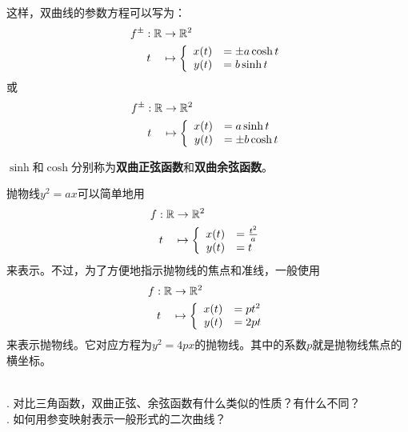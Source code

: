 \documentclass[12pt,UTF8,fontset=none]{ctexbook}
\begin{document}
这样，双曲线的参数方程可以写为：
\begin{align*}
    f^{\pm}: \mathbb{R} &\rightarrow \mathbb{R}^2 \\
    t\quad &\mapsto\left\{
        \begin{array}[]{rl}
            x(t) &= \pm a\cosh{t} \\
            y(t) &= b\sinh{t} \\
        \end{array}
    \right.
\end{align*}
或
\begin{align*}
    f^{\pm}: \mathbb{R} &\rightarrow \mathbb{R}^2 \\
    t\quad &\mapsto\left\{
        \begin{array}[]{rl}
            x(t) &= a\sinh{t} \\
            y(t) &= \pm b\cosh{t} \\
        \end{array}
    \right.
\end{align*}

$\sinh$和$\cosh$分别称为\textbf{双曲正弦函数}和\textbf{双曲余弦函数}。

抛物线$y^2 = ax$可以简单地用
\begin{align*}
    f: \mathbb{R} &\rightarrow \mathbb{R}^2 \\
    t\quad &\mapsto\left\{
        \begin{array}[]{rl}
            x(t) &= \frac{t^2}{a} \\
            y(t) &= t \\
        \end{array}
    \right.
\end{align*}
来表示。不过，为了方便地指示抛物线的焦点和准线，一般使用
\begin{align*}
    f: \mathbb{R} &\rightarrow \mathbb{R}^2 \\
    t\quad &\mapsto\left\{
        \begin{array}[]{rl}
            x(t) &= pt^2 \\
            y(t) &= 2pt \\
        \end{array}
    \right.
\end{align*}
来表示抛物线。它对应方程为$y^2 = 4px$的抛物线。其中的系数$p$就是抛物线焦点的横坐标。

\begin{sk}
    \mbox{} \\
    . 对比三角函数，双曲正弦、余弦函数有什么类似的性质？有什么不同？\\
    . 如何用参变映射表示一般形式的二次曲线？\\
\end{sk}
\end{document}
